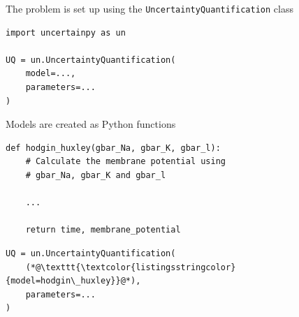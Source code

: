 \documentclass[presentation]{beamer}
\begin{document}

\begin{frame}[fragile]{The problem is set up using the
            \lstinline|UncertaintyQuantification| class}


  \begin{lstlisting}
import uncertainpy as un

UQ = un.UncertaintyQuantification(
    model=...,
    parameters=...
)
  \end{lstlisting}
\end{frame}






\begin{frame}[fragile]{Models are created as Python functions}


  \begin{lstlisting}
def hodgin_huxley(gbar_Na, gbar_K, gbar_l):
    # Calculate the membrane potential using
    # gbar_Na, gbar_K and gbar_l

    ...

    return time, membrane_potential
  \end{lstlisting}

\end{frame}



\begin{frame}[fragile]

\begin{lstlisting}
UQ = un.UncertaintyQuantification(
    (*@\texttt{\textcolor{listingsstringcolor}{model=hodgin\_huxley}}@*),
    parameters=...
)
\end{lstlisting}
\end{frame}


\end{document}
